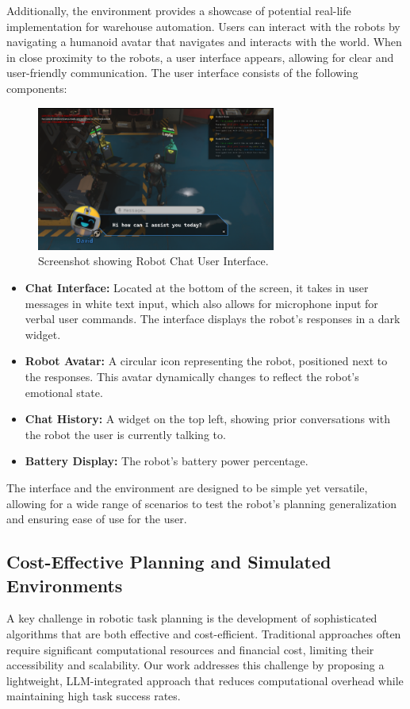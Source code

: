 \documentclass[pdflatex,sn-mathphys-num]{sn-jnl}
\theoremstyle{thmstyleone}
\theoremstyle{thmstyletwo}%
\theoremstyle{thmstylethree}%
\begin{document}
Additionally, the environment provides a showcase of potential real-life implementation for warehouse automation.
Users can interact with the robots by navigating a humanoid avatar that navigates and interacts with the world. When in close proximity to the robots, a user interface appears, allowing for clear and user-friendly communication. The user interface consists of the following components:
\begin{figure}[H]
\centering
\includegraphics[width=0.7\textwidth]{figures/Picture9.png}
\caption{Screenshot showing Robot Chat User Interface.}\label{fig4}
\end{figure}
\begin{itemize}
\item \textbf{Chat Interface:} Located at the bottom of the screen, it takes in user messages in white text input, which also allows for microphone input for verbal user commands. The interface displays the robot's responses in a dark widget.
\item \textbf{Robot Avatar:} A circular icon representing the robot, positioned next to the responses. This avatar dynamically changes to reflect the robot's emotional state.
\item \textbf{Chat History:} A widget on the top left, showing prior conversations with the robot the user is currently talking to.
\item \textbf{Battery Display:} The robot's battery power percentage.
\end{itemize}

The interface and the environment are designed to be simple yet versatile, allowing for a wide range of scenarios to test the robot's planning generalization and ensuring ease of use for the user.


\subsection{Cost-Effective Planning and Simulated Environments}
A key challenge in robotic task planning is the development of sophisticated algorithms that are both effective and cost-efficient. Traditional approaches often require significant computational resources and financial cost, limiting their accessibility and scalability. Our work addresses this challenge by proposing a lightweight, LLM-integrated approach that reduces computational overhead while maintaining high task success rates.
\end{document}

